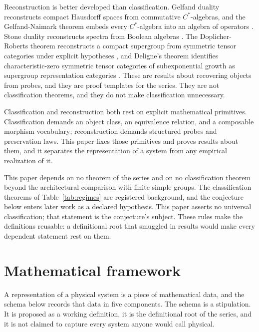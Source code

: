 \documentclass[11pt,letterpaper]{article}
\theoremstyle{definition}
\theoremstyle{remark}
\begin{document}
Reconstruction is better developed than classification. Gelfand duality reconstructs compact Hausdorff spaces from commutative $C^*$-algebras, and the Gelfand-Naimark theorem embeds every $C^*$-algebra into an algebra of operators \cite{gelfand-naimark1943}. Stone duality reconstructs spectra from Boolean algebras \cite{stone1936}. The Doplicher-Roberts theorem reconstructs a compact supergroup from symmetric tensor categories under explicit hypotheses \cite{doplicher-roberts}, and Deligne's theorem identifies characteristic-zero symmetric tensor categories of subexponential growth as supergroup representation categories \cite{deligne2002}. These are results about recovering objects from probes, and they are proof templates for the series. They are not classification theorems, and they do not make classification unnecessary.

Classification and reconstruction both rest on explicit mathematical primitives. Classification demands an object class, an equivalence relation, and a composable morphism vocabulary; reconstruction demands structured probes and preservation laws. This paper fixes those primitives and proves results about them, and it separates the representation of a system from any empirical realization of it.

This paper depends on no theorem of the series and on no classification theorem beyond the architectural comparison with finite simple groups. The classification theorems of Table~\ref{tab:regimes} are registered background, and the conjecture below enters later work as a declared hypothesis. This paper asserts no universal classification; that statement is the conjecture's subject. These rules make the definitions reusable: a definitional root that smuggled in results would make every dependent statement rest on them.

\section{Mathematical framework}
\label{sec:framework}

A representation of a physical system is a piece of mathematical data, and the schema below records that data in five components. The schema is a stipulation. It is proposed as a working definition, it is the definitional root of the series, and it is not claimed to capture every system anyone would call physical.
\end{document}
